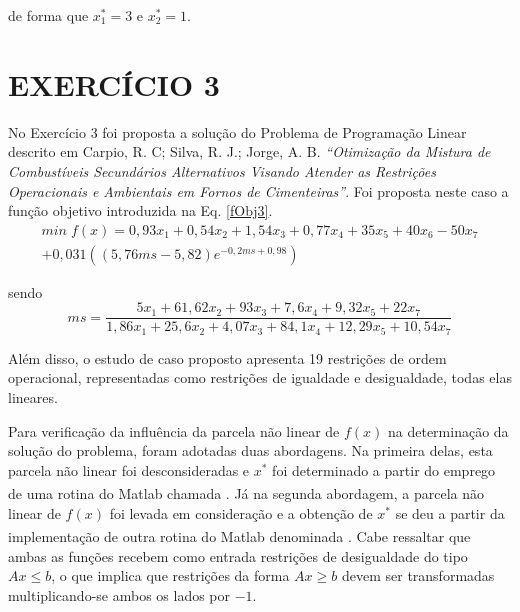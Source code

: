 \documentclass[12pt]{article}
\begin{document}
 	\noindent de forma que $ x_1^* = 3 $ e $ x_2^* = 1 $.
 	
 	
 	\section{EXERCÍCIO 3}
 	
 	No Exercício 3 foi proposta a solução do Problema de Programação Linear descrito em Carpio, R. C; Silva, R. J.; Jorge, A. B. \textit{“Otimização da Mistura de Combustíveis Secundários Alternativos Visando Atender as Restrições Operacionais e Ambientais em Fornos de Cimenteiras”}. Foi proposta neste caso a função objetivo introduzida na Eq. \ref{fObj3}.
 	\begin{equation}
	 	\begin{split}
		 	min \; f(x) = 0,93 x_1 + 0,54 x_2 + 1,54 x_3 + 0,77 x_4 + 35 x_5 + 40 x_6 - 50 x_7 \\
		 	 + 0,031((5,76ms - 5,82) e^{-0,2ms + 0,98})
		 	\label{fObj3}
	 	\end{split}
 	\end{equation}
 	
 	\noindent sendo 
 	\begin{equation}
	 	ms = \frac{5 x_1 + 61,62 x_2 + 93 x_3 + 7,6 x_4 + 9,32 x_5 + 22 x_7}{1,86 x_1 + 25,6 x_2 + 4,07 x_3 + 84,1 x_4 + 12,29 x_5 + 10,54 x_7}
 	\end{equation}
 	
 	Além disso, o estudo de caso proposto apresenta 19 restrições de ordem operacional, representadas como restrições de igualdade e desigualdade, todas elas lineares. 
 	
 	Para verificação da influência da parcela não linear de $ f(x) $ na determinação da solução do problema, foram adotadas duas abordagens. Na primeira delas, esta parcela não linear foi desconsideradas e $ x^* $ foi determinado a partir do emprego de uma rotina do Matlab\textsuperscript{\textregistered} chamada . Já na segunda abordagem, a parcela não linear de $ f(x) $ foi levada em consideração e a obtenção de $ x^* $ se deu a partir da implementação de outra rotina do Matlab\textsuperscript{\textregistered} denominada . Cabe ressaltar que ambas as funções recebem como entrada restrições de desigualdade do tipo $ Ax \leq b $, o que implica que restrições da forma $ Ax \geq b $ devem ser transformadas multiplicando-se ambos os lados por $ -1 $.
 	
\end{document}
